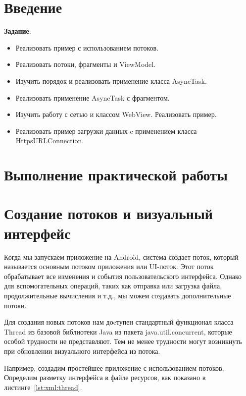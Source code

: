 \graphicspath{{./eleventh/img}}

\section*{\LARGE{Введение}}

\textbf{Задание}:
\begin{itemize}
	\item Реализовать пример с использованием потоков.
	\item Реализовать потоки, фрагменты и ViewModel.
	\item Изучить порядок и реализовать применение класса AsyncTask.
	\item Реализовать применение AsyncTask с фрагментом.
	\item Изучить работу с сетью и классом WebView. Реализовать пример.
	\item Реализовать пример загрузки данных c применением класса
		HttpsURLConnection.
\end{itemize}

\clearpage

\section*{\LARGE{Выполнение практической работы}}

\section{Создание потоков и визуальный интерфейс}
Когда мы запускаем приложение на Android, система создает поток, который
называется основным потоком приложения или UI-поток. Этот поток
обрабатывает все изменения и события пользовательского интерфейса.
Однако для вспомогательных операций, таких как отправка или загрузка
файла, продолжительные вычисления и т.д., мы можем создавать
дополнительные потоки.\par
Для создания новых потоков нам доcтупен стандартный функционал класса
Thread из базовой библиотеки Java из пакета java.util.concurrent, которые
особой трудности не представляют. Тем не менее трудности могут
возникнуть при обновлении визуального интерфейса из потока.\par
Например, создадим простейшее приложение с использованием потоков.
Определим разметку интерфейса в файле ресурсов, как показано
в листинге~\ref{lst:xml:thread}.

